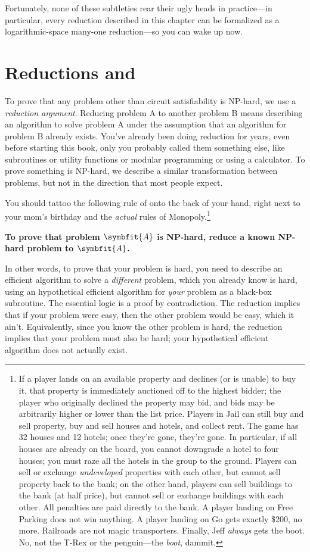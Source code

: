 Fortunately, none of these subtleties rear their ugly heads in practice---in particular, every reduction described in this chapter can be formalized as a logarithmic-space many-one reduction---so you can wake up now.

\section{Reductions and }
\label{sec:12.5}

To prove that any problem other than circuit satisfiability is NP-hard, we use a \textit{reduction argument}.
Reducing problem A to another problem B means describing an algorithm to solve problem A under the assumption that an algorithm for problem B already exists.
You’ve already been doing reduction for years, even before starting this book, only you probably called them something else, like subroutines or utility functions or modular programming or using a calculator.
To prove something is NP-hard, we describe a similar transformation between problems, but not in the direction that most people expect.

You should tattoo the following rule of onto the back of your hand, right next to your mom’s birthday and the \textit{actual} rules of Monopoly.\footnote{If a player lands on an available property and declines (or is unable) to buy it, that property is immediately auctioned off to the highest bidder; the player who originally declined the property may bid, and bids may be arbitrarily higher or lower than the list price. Players in Jail can still buy and sell property, buy and sell houses and hotels, and collect rent. The game has 32 houses and 12 hotels; once they’re gone, they’re gone. In particular, if all houses are already on the board, you cannot downgrade a hotel to four houses; you must raze all the hotels in the group to the ground. Players can sell or exchange \textit{undeveloped} properties with each other, but cannot sell property back to the bank; on the other hand, players can sell buildings to the bank (at half price), but cannot sell or exchange buildings with each other. All penalties are paid directly to the bank. A player landing on Free Parking does not win anything. A player landing on Go gets exactly \$200, no more. Railroads are not magic transporters. Finally, Jeff \textit{always} gets the boot. No, not the T-Rex or the penguin---the \textit{boot}, dammit.}
\begin{problembox}
\centering
\textbf{To prove that problem $\symbfit{A}$ is NP-hard, reduce a known NP-hard problem to $\symbfit{A}$.}
\end{problembox}
In other words, to prove that your problem is hard, you need to describe an efficient algorithm to solve a \textit{different} problem, which you already know is hard, using an hypothetical efficient algorithm for \textit{your} problem as a black-box subroutine.
The essential logic is a proof by contradiction.
The reduction implies that if your problem were easy, then the other problem would be easy, which it ain’t.
Equivalently, since you know the other problem is hard, the reduction implies that your problem must also be hard; your hypothetical efficient algorithm does not actually exist.


